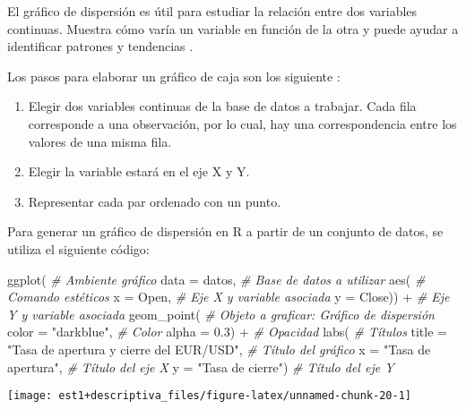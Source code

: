 \documentclass[
]{book}
\newenvironment{Shaded}{\begin{snugshade}}{\end{snugshade}}
\newcommand{\AttributeTok}[1]{\textcolor[rgb]{0.77,0.63,0.00}{#1}}
\newcommand{\CommentTok}[1]{\textcolor[rgb]{0.56,0.35,0.01}{\textit{#1}}}
\newcommand{\FloatTok}[1]{\textcolor[rgb]{0.00,0.00,0.81}{#1}}
\newcommand{\FunctionTok}[1]{\textcolor[rgb]{0.00,0.00,0.00}{#1}}
\newcommand{\NormalTok}[1]{#1}
\newcommand{\SpecialCharTok}[1]{\textcolor[rgb]{0.00,0.00,0.00}{#1}}
\newcommand{\StringTok}[1]{\textcolor[rgb]{0.31,0.60,0.02}{#1}}
\providecommand{\tightlist}{%
  \setlength{\itemsep}{0pt}\setlength{\parskip}{0pt}}
\begin{document}
El gráfico de dispersión es útil para estudiar la relación entre dos variables continuas. Muestra cómo varía un variable en función de la otra y puede ayudar a identificar patrones y tendencias \citep{rowlingson2016data}.

Los pasos para elaborar un gráfico de caja son los siguiente \citep{healy2019data}:

\begin{enumerate}
\def\labelenumi{\arabic{enumi}.}
\tightlist
\item
  Elegir dos variables continuas de la base de datos a trabajar. Cada fila corresponde a una observación, por lo cual, hay una correspondencia entre los valores de una misma fila.
\item
  Elegir la variable estará en el eje X y Y.
\item
  Representar cada par ordenado con un punto.
\end{enumerate}

Para generar un gráfico de dispersión en R a partir de un conjunto de datos, se utiliza el siguiente código:

\begin{Shaded}
\begin{Highlighting}[]
\FunctionTok{ggplot}\NormalTok{( }\CommentTok{\# Ambiente gráfico}
  \AttributeTok{data =}\NormalTok{ datos, }\CommentTok{\# Base de datos a utilizar}
  \FunctionTok{aes}\NormalTok{( }\CommentTok{\# Comando estéticos}
    \AttributeTok{x =}\NormalTok{ Open, }\CommentTok{\# Eje X y variable asociada}
    \AttributeTok{y =}\NormalTok{ Close)) }\SpecialCharTok{+} \CommentTok{\# Eje Y y variable asociada}
  \FunctionTok{geom\_point}\NormalTok{( }\CommentTok{\# Objeto a graficar: Gráfico de dispersión}
    \AttributeTok{color =} \StringTok{"darkblue"}\NormalTok{, }\CommentTok{\# Color}
    \AttributeTok{alpha =} \FloatTok{0.3}\NormalTok{) }\SpecialCharTok{+} \CommentTok{\# Opacidad}
  \FunctionTok{labs}\NormalTok{( }\CommentTok{\# Títulos}
    \AttributeTok{title =} \StringTok{"Tasa de apertura y cierre del EUR/USD"}\NormalTok{, }\CommentTok{\# Título del gráfico}
    \AttributeTok{x =} \StringTok{"Tasa de apertura"}\NormalTok{, }\CommentTok{\# Título del eje X}
    \AttributeTok{y =} \StringTok{"Tasa de cierre"}\NormalTok{) }\CommentTok{\# Título del eje Y}
\end{Highlighting}
\end{Shaded}

\begin{center}\texttt{[image: est1+descriptiva\_files/figure-latex/unnamed-chunk-20-1]} \end{center}
\end{document}
